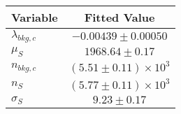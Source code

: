\begin{tabular}[t]{lc}
\hline
Variable &Fitted Value\\
\hline\hline
$\lambda_{bkg,c}$&$-0.00439\pm0.00050$\\
\hline
$\mu_{S}$&$1968.64\pm0.17$\\
\hline
$n_{bkg,c}$&$(5.51\pm0.11)\times 10^3$\\
\hline
$n_{S}$&$(5.77\pm0.11)\times 10^3$\\
\hline
$\sigma_{S}$&$9.23\pm0.17$\\
\hline
\end{tabular}